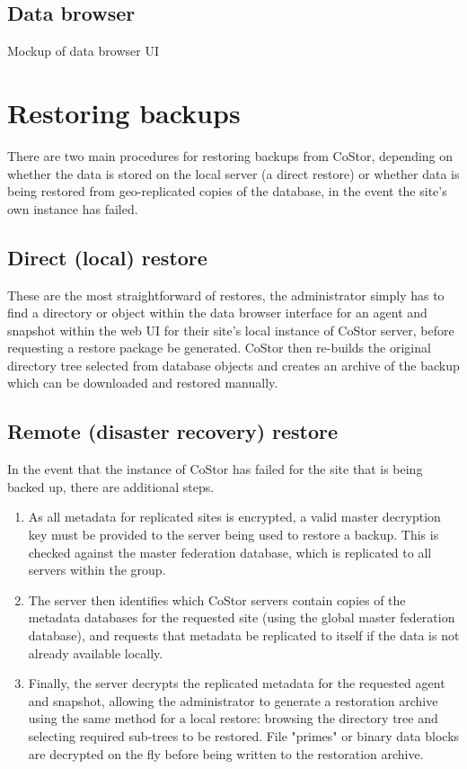 \documentclass[bsc,frontabs,twoside,singlespacing,parskip,deptreport]{infthesis}     %
\begin{document}
\subsection{Data browser}

Mockup of data browser UI

\section{Restoring backups}
\label{sec:restoringbackups}


There are two main procedures for restoring backups from CoStor, depending on whether the data
is stored on the local server (a direct restore) or whether data is being restored from 
geo-replicated copies of the database, in the event the site's own instance has failed.

\subsection{Direct (local) restore}

These are the most straightforward of restores, the administrator simply has to find a directory
or object within the data browser interface for an agent and snapshot within the web UI for their 
site's local instance of CoStor server, before requesting a restore package be generated. CoStor 
then re-builds the original directory tree selected from database objects and creates an archive
of the backup which can be downloaded and restored manually.

\subsection{Remote (disaster recovery) restore}

In the event that the instance of CoStor has failed for the site that is being backed up, there
are additional steps.

\begin{enumerate}
	\item As all metadata for replicated sites is encrypted, a valid master decryption key must
	be provided to the server being used to restore a backup. This is checked against the master
	federation database, which is replicated to all servers within the group.
	\item The server then identifies which CoStor servers contain copies of the metadata 
	databases for the requested site (using the global master federation database), and requests
	that metadata be replicated to itself if the data is not already available locally.
	\item Finally, the server decrypts the replicated metadata for the requested agent and 
	snapshot, allowing the administrator to generate a restoration archive using the same
	method for a local restore: browsing the directory tree and selecting required sub-trees
	to be restored. File "primes" or binary data blocks are decrypted on the fly before being 
	written to the restoration archive.
\end{enumerate}
\end{document}
